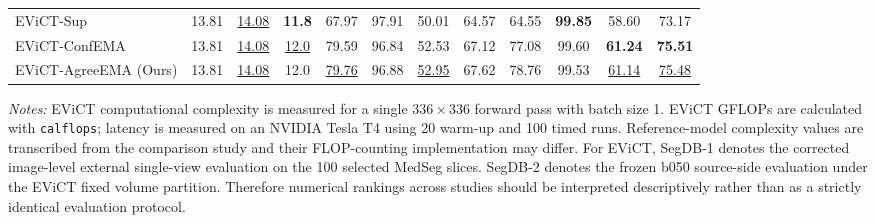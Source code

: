 \begin{table}[t]
{\begin{tabular}{lccc|cccc|cccc}
\midrule
EViCT-Sup & 13.81 & \underline{14.08} & \textbf{11.8} & 67.97 & 97.91 & 50.01 & 64.57 & 64.55 & \textbf{99.85} & 58.60 & 73.17 \\
EViCT-ConfEMA & 13.81 & \underline{14.08} & \underline{12.0} & 79.59 & 96.84 & 52.53 & 67.12 & 77.08 & 99.60 & \textbf{61.24} & \textbf{75.51} \\
EViCT-AgreeEMA (Ours) & 13.81 & \underline{14.08} & 12.0 & \underline{79.76} & 96.88 & \underline{52.95} & 67.62 & 78.76 & 99.53 & \underline{61.14} & \underline{75.48} \\
\bottomrule
\end{tabular}%
}
\begin{minipage}{0.99\textwidth}
\footnotesize \textit{Notes:} EViCT computational complexity is measured for a single $336\times336$ forward pass with batch size 1. EViCT GFLOPs are calculated with \texttt{calflops}; latency is measured on an NVIDIA Tesla T4 using 20 warm-up and 100 timed runs. Reference-model complexity values are transcribed from the comparison study and their FLOP-counting implementation may differ. For EViCT, SegDB-1 denotes the corrected image-level external single-view evaluation on the 100 selected MedSeg slices. SegDB-2 denotes the frozen b050 source-side evaluation under the EViCT fixed volume partition. Therefore numerical rankings across studies should be interpreted descriptively rather than as a strictly identical evaluation protocol.
\end{minipage}
\end{table}